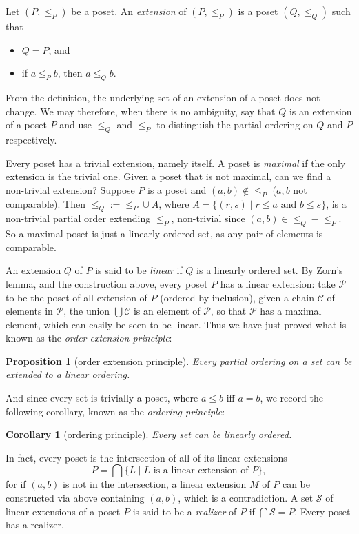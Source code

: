 \documentclass[12pt]{article}
\newtheorem{prop}{Proposition}
\newtheorem{cor}{Corollary}
\begin{document}
Let $(P,\le_P)$ be a poset.  An \emph{extension} of $(P,\le_P)$ is a poset $(Q,\le_Q)$ such that
\begin{itemize}
\item $Q=P$, and
\item if $a\le_P b$, then $a\le_Q b$.
\end{itemize}

From the definition, the underlying set of an extension of a poset does not change.  We may therefore, when there is no ambiguity, say that $Q$ is an extension of a poset $P$ and use $\le_Q$ and $\le_P$ to distinguish the partial ordering on $Q$ and $P$ respectively.

Every poset has a trivial extension, namely itself.  A poset is \emph{maximal} if the only extension is the trivial one.  Given a poset that is not maximal, can we find a non-trivial extension?  Suppose $P$ is a poset and $(a,b)\notin \le_P$ ($a,b$ not comparable).  Then $\le_Q:=\le_P\cup A$, where $A=\lbrace (r,s)\mid r\le a\mbox{ and }b\le s\rbrace$, is a non-trivial partial order extending $\le_P$, non-trivial since $(a,b)\in \le_Q-\le_P$.  So a maximal poset is just a linearly ordered set, as any pair of elements is comparable.

An extension $Q$ of $P$ is said to be \emph{linear} if $Q$ is a linearly ordered set.  By Zorn's lemma, and the construction above, every poset $P$ has a linear extension: take $\mathcal{P}$ to be the poset of all extension of $P$ (ordered by inclusion), given a chain $\mathcal{C}$ of elements in $\mathcal{P}$, the union $\bigcup \mathcal{C}$ is an element of $\mathcal{P}$, so that $\mathcal{P}$ has a maximal element, which can easily be seen to be linear.  Thus we have just proved what is known as the \emph{order extension principle}:
\begin{prop}[order extension principle] Every partial ordering on a set can be extended to a linear ordering. \end{prop}
And since every set is trivially a poset, where $a\le b$ iff $a=b$, we record the following corollary, known as the \emph{ordering principle}:
\begin{cor}[ordering principle] Every set can be linearly ordered. \end{cor}

In fact, every poset is the intersection of all of its linear extensions
$$P=\bigcap \lbrace L \mid L \mbox{ is a linear extension of } P\rbrace,$$
for if $(a,b)$ is not in the intersection, a linear extension $M$ of $P$ can be constructed via above containing $(a,b)$, which is a contradiction.  A set $\mathcal{S}$ of linear extensions of a poset $P$ is said to be a \emph{realizer} of $P$ if $\displaystyle{\bigcap \mathcal{S}=P}$.  Every poset has a realizer.
\end{document}
